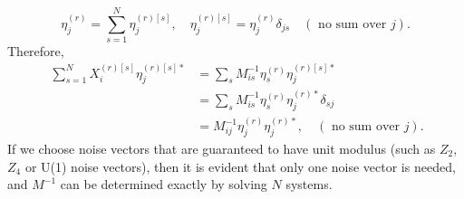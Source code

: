 \begin{equation}
    \eta_{j}^{(r)}=\sum_{s=1}^{N} \eta_{j}^{(r)[s]}, \quad \eta_{j}^{(r)[s]}=\eta_{j}^{(r)} \delta_{j s} \quad(\text { no sum over } j).
\end{equation}
Therefore,
\begin{equation}\
    \begin{aligned}
    \sum_{s=1}^{N} X_{i}^{(r)[s]} \eta_{j}^{(r)[s] *} &=\sum_{s} M_{i s}^{-1} \eta_{s}^{(r)} \eta_{j}^{(r)[s] *} \\
    &=\sum_{s} M_{i s}^{-1} \eta_{s}^{(r)} \eta_{j}^{(r) *} \delta_{s j}\\
    &=M_{i j}^{-1} \eta_{j}^{(r)} \eta_{j}^{(r) *}, \quad(\text { no sum over } j).
\end{aligned}
\end{equation}
If we choose noise vectors that are guaranteed to have unit modulus (such as $Z_2$, $Z_4$ or U(1) noise vectors), then it is evident that only one noise vector is needed, and $M^{-1}$ can be determined exactly by solving $N$ systems.

